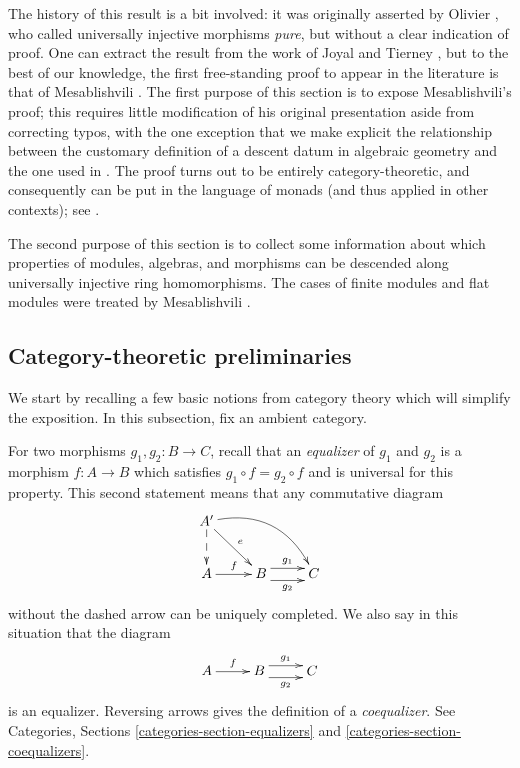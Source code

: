 \medskip\noindent
The history of this result is a bit involved: it was originally asserted
by Olivier \cite{olivier}, who  called universally injective morphisms
{\it pure}, but without a clear indication of proof. One can extract the
result from the work of Joyal and Tierney \cite{joyal-tierney}, but to the
best of our knowledge, the first free-standing proof to appear in the
literature is that of Mesablishvili \cite{mesablishvili1}. The first purpose
of this section is to expose Mesablishvili's proof; this requires little
modification of his original presentation aside from correcting typos, with
the one exception that we make explicit the relationship between the
customary definition of a descent datum in algebraic geometry and the one
used in \cite{mesablishvili1}. The proof turns out to be entirely
category-theoretic, and consequently can be put in the language of monads
(and thus applied in other contexts); see \cite{janelidze-tholen}.

\medskip\noindent
The second purpose of this section is to collect some information about which 
properties of modules, algebras, and morphisms can be descended along 
universally injective ring homomorphisms. The cases of finite modules
and flat modules were treated by Mesablishvili \cite{mesablishvili2}.


\subsection{Category-theoretic preliminaries}
\label{subsection-category-prelims}

\noindent
We start by recalling a few basic notions from category theory which will 
simplify the exposition. In this subsection, fix an ambient category.

\medskip\noindent
For two morphisms $g_1, g_2: B \to C$, recall that an {\it equalizer}
of $g_1$ and $g_2$  is a morphism $f: A \to B$ which satisfies
$g_1 \circ f = g_2 \circ f$ and is universal for this property.
This second statement means that any commutative diagram 
$$
\xymatrix{A' \ar[rd]^e \ar@/^1.5pc/[rrd] \ar@{-->}[d] & & \\
A \ar[r]^f & B \ar@<1ex>[r]^{g_1} \ar@<-1ex>[r]_{g_2} & 
C
}
$$
without the dashed arrow can be uniquely completed. We also say in this 
situation that the diagram
\begin{equation}
\label{equation-equalizer}
\xymatrix{
A \ar[r]^f  & B \ar@<1ex>[r]^{g_1} \ar@<-1ex>[r]_{g_2} & C
}
\end{equation}
is an equalizer. Reversing arrows gives the definition of a {\it coequalizer}.
See Categories, Sections \ref{categories-section-equalizers} and
\ref{categories-section-coequalizers}.

